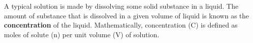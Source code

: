      
      \label{m38712*id282848}A typical solution is made by dissolving some solid substance in a liquid. The amount of substance that is dissolved in a given volume of liquid is known as the \textbf{concentration} of the liquid. Mathematically, concentration (C) is defined as moles of solute (n) per unit volume (V) of solution.\par 
      \label{m38712*id282860}\nopagebreak\noindent{}
    
